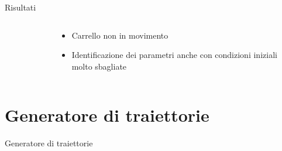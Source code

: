 \documentclass[]{beamer}
\begin{document}
	\begin{frame}{Risultati}
		\centering
		\begin{columns}
			\begin{column}{.5\textwidth}
				\centering
				\begin{figure}
					
				\end{figure}
			\end{column}
			\begin{column}{.5\textwidth}
				\centering
				\begin{itemize}
					\item Carrello non in movimento
					\item Identificazione dei parametri anche con condizioni iniziali molto sbagliate
				\end{itemize}
			\end{column}
		\end{columns}
	\end{frame}
	
	
	\section{Generatore di traiettorie}
	
	\begin{frame}{Generatore di traiettorie}
				
	\end{frame}
\end{document}
